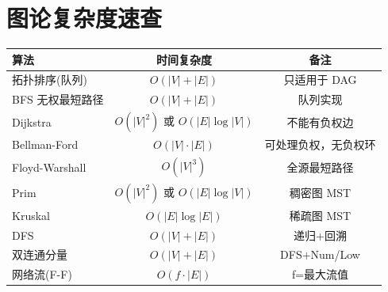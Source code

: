 \documentclass[10pt,a4paper]{article}
\begin{document}
\section*{图论复杂度速查}

{\small
\begin{tabular}{|l|c|c|}
\hline
\textbf{算法} & \textbf{时间复杂度} & \textbf{备注} \\
\hline
拓扑排序(队列) & $O(|V|+|E|)$ & 只适用于 DAG \\
BFS 无权最短路径 & $O(|V|+|E|)$ & 队列实现 \\
Dijkstra & $O(|V|^2)$ 或 $O(|E|\log|V|)$ & 不能有负权边 \\
Bellman-Ford & $O(|V|\cdot|E|)$ & 可处理负权，无负权环 \\
Floyd-Warshall & $O(|V|^3)$ & 全源最短路径 \\
Prim & $O(|V|^2)$ 或 $O(|E|\log|V|)$ & 稠密图 MST \\
Kruskal & $O(|E|\log|E|)$ & 稀疏图 MST \\
DFS & $O(|V|+|E|)$ & 递归+回溯 \\
双连通分量 & $O(|V|+|E|)$ & DFS+Num/Low \\
网络流(F-F) & $O(f\cdot|E|)$ & f=最大流值 \\
\hline
\end{tabular}
}
\end{document}
